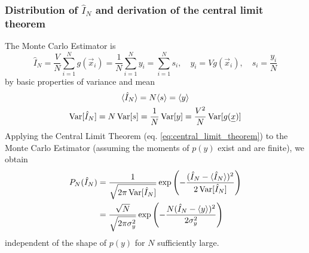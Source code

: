 \subsubsection{Distribution of $\hat{I}_N$ and derivation of the central limit theorem\skipthis}
The Monte Carlo Estimator is
\begin{equation}
    \hat{I}_N = \frac{V}{N} \sum_{i=1}^{N} g(\vec{x}_i) = \frac{1}{N} \sum_{i=1}^{N} y_i = \sum_{i=1}^{N} s_i, \quad y_i = V g(\vec{x}_i), \quad s_i = \frac{y_i}{N}
\end{equation}
by basic properties of variance and mean
\begin{equation}
    \begin{gathered}
        \langle \hat{I}_N \rangle = N \langle s \rangle = \langle y \rangle  \\
        \Var[\hat{I}_N] = N \Var[s] = \frac{1}{N} \Var[y] = \frac{V^2}{N} \Var[g(\vec{x})]
    \end{gathered}
\end{equation}
Applying the Central Limit Theorem (eq. \ref{eq:central_limit_theorem}) to the Monte Carlo Estimator
(assuming the moments of $p(y)$ exist and are finite), we obtain
\begin{equation}
    \begin{aligned}
        P_N(\hat{I}_N) &= \frac{1}{\sqrt{2\pi \operatorname{Var}[\hat{I}_N]}} \exp{\left( -\frac{(\hat{I}_N-\langle \hat{I}_N \rangle)^2}{2\operatorname{Var}[\hat{I}_N]} \right)} \\
                       &= \frac{\sqrt{N}}{\sqrt{2\pi \sigma_y^2}} \exp{\left( -\frac{N(\hat{I}_N-\langle y \rangle)^2}{2\sigma_y^2} \right)}
    \end{aligned}
\end{equation}
independent of the shape of $p(y)$ for $N$ sufficiently large.

